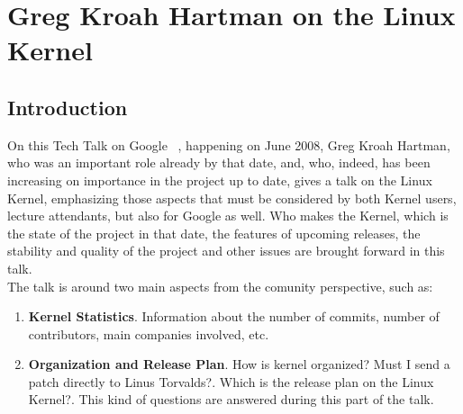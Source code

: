\documentclass[11pt]{article}
\begin{document}
\pagebreak

\section{Greg Kroah Hartman on the Linux Kernel}
\label{sec:linuxkernel}
\subsection{Introduction}
On this Tech Talk on Google ~\cite{TALK04}, happening on June 2008, Greg Kroah Hartman, who was an important role already by that date, and, who, indeed, has been increasing on importance in the project up to date, gives a talk on the Linux Kernel, emphasizing those aspects that must be considered by both Kernel users, lecture attendants, but also for Google as well. Who makes the Kernel, which is the state of the project in that date, the features of upcoming releases, the stability and quality of the project and other issues are brought forward in this talk.\\
The talk is around two main aspects from the comunity perspective, such as:
\begin{enumerate}
\item{\textbf{Kernel Statistics}}. Information about the number of commits, number of contributors, main companies involved, etc. 
\item{\textbf{Organization and Release Plan}}. How is kernel organized? Must I send a patch directly to Linus Torvalds?. Which is the release plan on the Linux Kernel?. This kind of questions are answered during this part of the talk.
\end{enumerate}
\end{document}

